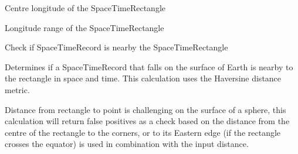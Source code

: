 \documentclass[letterpaper,10pt,english]{sphinxmanual}
\begin{document}
\begin{fulllineitems}
\begin{fulllineitems}
\end{fulllineitems}


\begin{fulllineitems}
\label{\detokenize{shape:GeoSpatialTools.shape.SpaceTimeRectangle.lon}}
\pysigstartsignatures
\pysigline
{}
\pysigstopsignatures
\sphinxAtStartPar
Centre longitude of the SpaceTimeRectangle

\end{fulllineitems}


\begin{fulllineitems}
\label{\detokenize{shape:GeoSpatialTools.shape.SpaceTimeRectangle.lon_range}}
\pysigstartsignatures
\pysigline
{}
\pysigstopsignatures
\sphinxAtStartPar
Longitude range of the SpaceTimeRectangle

\end{fulllineitems}


\begin{fulllineitems}
\label{\detokenize{shape:GeoSpatialTools.shape.SpaceTimeRectangle.nearby}}
\pysigstartsignatures
\pysiglinewithargsret
{}
{\sphinxparamcomma {}\sphinxparamcomma {}}
{}
\pysigstopsignatures
\sphinxAtStartPar
Check if SpaceTimeRecord is nearby the SpaceTimeRectangle

\sphinxAtStartPar
Determines if a SpaceTimeRecord that falls on the surface of Earth is
nearby to the rectangle in space and time. This calculation uses the
Haversine distance metric.

\sphinxAtStartPar
Distance from rectangle to point is challenging on the surface of a
sphere, this calculation will return false positives as a check based
on the distance from the centre of the rectangle to the corners, or
to its Eastern edge (if the rectangle crosses the equator) is used in
combination with the input distance.


\end{fulllineitems}
\end{fulllineitems}
\end{document}
